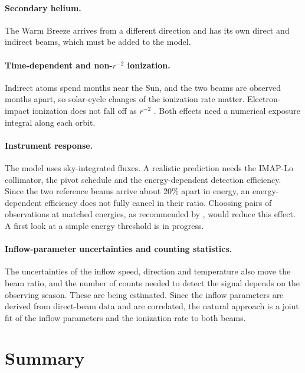\documentclass[10pt,a4paper,twocolumn]{article}
\begin{document}
\paragraph{Secondary helium.} The Warm Breeze \citep{Kubiak2014} arrives from
a different direction and has its own direct and indirect beams, which must be
added to the model.

\paragraph{Time-dependent and non-$r^{-2}$ ionization.} Indirect atoms spend
months near the Sun, and the two beams are observed months apart, so
solar-cycle changes of the ionization rate matter. Electron-impact ionization
does not fall off as $r^{-2}$ \citep{Sokol2019}. Both effects need a numerical
exposure integral along each orbit.

\paragraph{Instrument response.} The model uses sky-integrated fluxes. A
realistic prediction needs the IMAP-Lo collimator, the pivot schedule
\citep{Kubiak2023} and the energy-dependent detection efficiency. Since the
two reference beams arrive about 20\% apart in energy, an energy-dependent
efficiency does not fully cancel in their ratio. Choosing pairs of
observations at matched energies, as recommended by \citet{Bzowski2023}, would
reduce this effect. A first look at a simple energy threshold is in progress.

\paragraph{Inflow-parameter uncertainties and counting statistics.} The
uncertainties of the inflow speed, direction and temperature
\citep{McComas2015} also move the beam ratio, and the number of counts
needed to detect the signal depends on the observing season. These are being
estimated. Since the inflow parameters are derived from direct-beam data and
are correlated, the natural approach is a joint fit of the inflow parameters
and the ionization rate to both beams.

\section{Summary}
\label{sec:summary}
\end{document}
